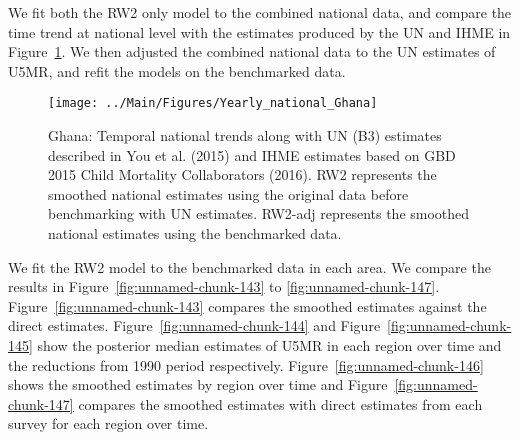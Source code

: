 \documentclass[12pt]{article}\usepackage[]{graphicx}\usepackage[]{color}
\newenvironment{knitrout}{}{} %
\begin{document}
We fit both the RW2 only model to the combined national data, and compare the time trend at national level with the estimates produced by the UN and IHME in Figure~\ref{fig:unnamed-chunk-142}. We then adjusted the combined national data to the UN estimates of U5MR, and refit the models on the benchmarked data. 

\begin{knitrout}
\color{fgcolor}\begin{figure}[bht]

{\centering \texttt{[image: ../Main/Figures/Yearly\_national\_Ghana]} 

}

\caption[Ghana]{Ghana: Temporal national trends along with UN (B3) estimates described in You et al. (2015) and IHME estimates based on GBD 2015 Child Mortality Collaborators (2016). RW2 represents the smoothed national estimates using the original data before benchmarking with UN estimates. RW2-adj represents the smoothed national estimates using the benchmarked data.}\label{fig:unnamed-chunk-142}
\end{figure}


\end{knitrout}
 

We fit the RW2 model to the benchmarked data in each area. 
We compare the results in Figure~\ref{fig:unnamed-chunk-143} to \ref{fig:unnamed-chunk-147}.
Figure~\ref{fig:unnamed-chunk-143} compares the smoothed estimates against the direct estimates. Figure~\ref{fig:unnamed-chunk-144} and Figure~\ref{fig:unnamed-chunk-145} show the posterior median estimates of U5MR in each region over time and the reductions from 1990 period respectively.
Figure~\ref{fig:unnamed-chunk-146} shows the smoothed estimates by region over time and Figure~\ref{fig:unnamed-chunk-147} compares the smoothed estimates with direct estimates from each survey for each region over time.




\end{document}
